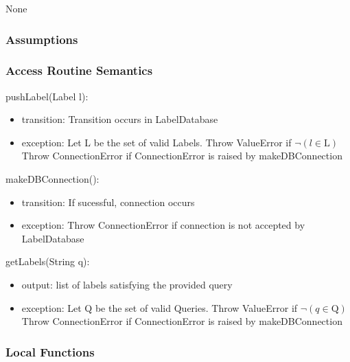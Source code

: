 \documentclass[12pt, titlepage]{article}
\begin{document}
  None
  
  \subsubsection{Assumptions}
  
  
  \subsubsection{Access Routine Semantics}
  
  \noindent pushLabel(Label l):
  \begin{itemize}
  \item transition: Transition occurs in LabelDatabase
  \item exception: Let L be the set of valid Labels. Throw ValueError if $\neg (l \in \text{L})$\\
  Throw ConnectionError if ConnectionError is raised by makeDBConnection
  \end{itemize}

  \noindent makeDBConnection():
  \begin{itemize}
  \item transition: If sucessful, connection occurs
  \item exception: Throw ConnectionError if connection is not accepted by LabelDatabase
  \end{itemize}

  \noindent getLabels(String q):
  \begin{itemize}
  \item output: list of labels satisfying the provided query
  \item exception: Let Q be the set of valid Queries. Throw ValueError if $\neg (q \in \text{Q})$\\
  Throw ConnectionError if ConnectionError is raised by makeDBConnection

  \end{itemize}
  
  
  
  \subsubsection{Local Functions}
\end{document}
